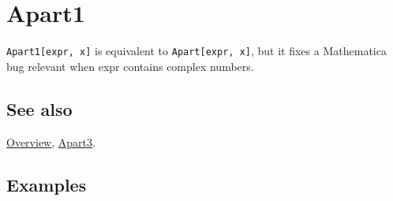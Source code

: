 \documentclass[../FeynCalcManual.tex]{subfiles}
\begin{document}
\hypertarget{apart1}{
\section{Apart1}\label{apart1}}

\texttt{Apart1[\allowbreak{}expr,\ \allowbreak{}x]} is equivalent to
\texttt{Apart[\allowbreak{}expr,\ \allowbreak{}x]}, but it fixes a
Mathematica bug relevant when expr contains complex numbers.

\subsection{See also}

\hyperlink{toc}{Overview}, \hyperlink{apart3}{Apart3}.

\subsection{Examples}
\end{document}
